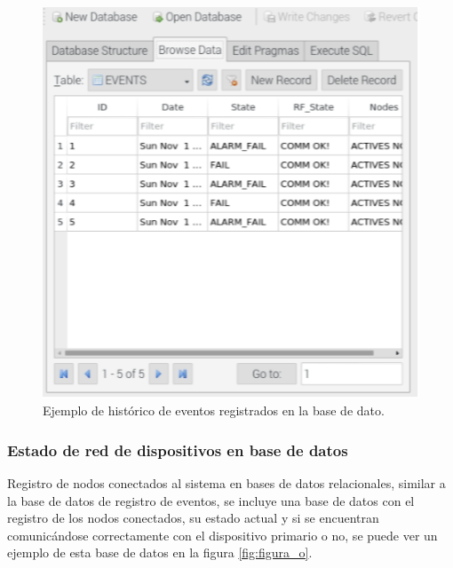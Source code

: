 \begin{figure}[ht]
	\centering
	\includegraphics[scale=.45]{./Figures/Capitulo4/Figura_P.png}
	\caption{Ejemplo de histórico de eventos registrados en la base de dato.}
	\label{fig:figura_p}
\end{figure}

\subsubsection{Estado de red de dispositivos en base de datos}
Registro de nodos conectados al sistema en bases de datos relacionales, similar a la base de datos de registro de eventos, se incluye una base de datos con el registro de los nodos conectados, su estado actual y si se encuentran comunicándose correctamente con el dispositivo primario o no, se puede ver un ejemplo de esta base de datos en la figura \ref{fig:figura_o}.


